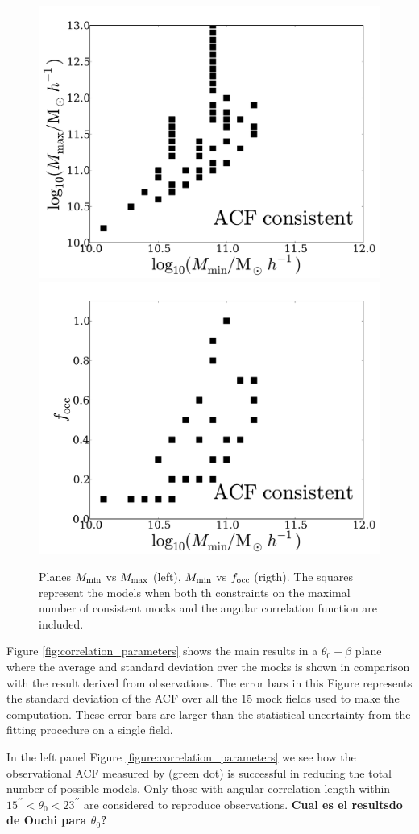 \documentclass[usenatbib]{mn2e}
\begin{document}
\begin{figure}
\begin{center}
\includegraphics[width=0.46\linewidth,angle=0]{./plots/Fig6_mass.pdf}
\hspace{5mm}
\includegraphics[width=0.46\linewidth,angle=0]{./plots/Fig6_f_occ.pdf}
\end{center}
\caption{Planes $M_{\rm min}$ vs $M_{\rm max}$ (left), $M_{\rm min}$
  vs $f_{\rm occ}$ (rigth). The squares represent the models when both
  th constraints on the maximal number of  consistent mocks and the
  angular correlation function are included. 
  \label{fig:restriction_mock_and_f_occ_corr}} 
\end{figure} 


Figure \ref{fig:correlation_parameters} shows the main results in a
$\theta_{0}-\beta$  plane where the average and standard deviation
over the mocks is shown in comparison with the result derived from
observations.  The error bars in this Figure represents the standard
deviation of the ACF over all the 15 mock fields used to make the
computation.  These error bars are larger than the statistical
uncertainty from the fitting procedure on a single field.  

In the left panel Figure \ref{figure:correlation_parameters} we see
how the observational ACF measured by \cite{Hayashino2004} (green dot)
is successful in reducing the total number of possible models. Only
those with angular-correlation length within
$15^{\prime\prime}<\theta_{0}<23^{\prime\prime}$ are considered to
reproduce observations. {\bf Cual es el resultsdo de Ouchi
  para $\theta_0$?}
\end{document}
